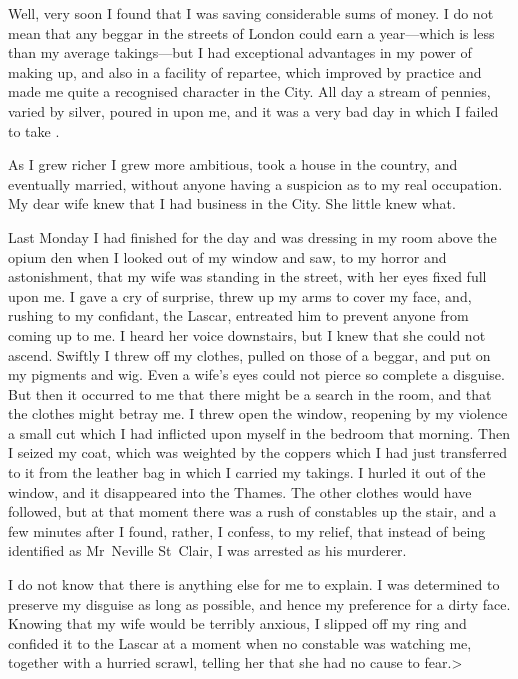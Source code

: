 Well, very soon I found that I was saving considerable sums of money. I do not mean that any beggar in the streets of London could earn  a year—which is less than my average takings—but I had exceptional advantages in my power of making up, and also in a facility of repartee, which improved by practice and made me quite a recognised character in the City. All day a stream of pennies, varied by silver, poured in upon me, and it was a very bad day in which I failed to take .

As I grew richer I grew more ambitious, took a house in the country, and eventually married, without anyone having a suspicion as to my real occupation. My dear wife knew that I had business in the City. She little knew what.

Last Monday I had finished for the day and was dressing in my room above the opium den when I looked out of my window and saw, to my horror and astonishment, that my wife was standing in the street, with her eyes fixed full upon me. I gave a cry of surprise, threw up my arms to cover my face, and, rushing to my confidant, the Lascar, entreated him to prevent anyone from coming up to me. I heard her voice downstairs, but I knew that she could not ascend. Swiftly I threw off my clothes, pulled on those of a beggar, and put on my pigments and wig. Even a wife's eyes could not pierce so complete a disguise. But then it occurred to me that there might be a search in the room, and that the clothes might betray me. I threw open the window, reopening by my violence a small cut which I had inflicted upon myself in the bedroom that morning. Then I seized my coat, which was weighted by the coppers which I had just transferred to it from the leather bag in which I carried my takings. I hurled it out of the window, and it disappeared into the Thames. The other clothes would have followed, but at that moment there was a rush of constables up the stair, and a few minutes after I found, rather, I confess, to my relief, that instead of being identified as Mr~Neville St~Clair, I was arrested as his murderer.

I do not know that there is anything else for me to explain. I was determined to preserve my disguise as long as possible, and hence my preference for a dirty face. Knowing that my wife would be terribly anxious, I slipped off my ring and confided it to the Lascar at a moment when no constable was watching me, together with a hurried scrawl, telling her that she had no cause to fear.>

